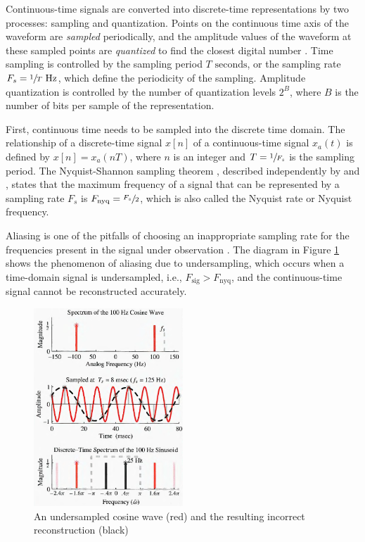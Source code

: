 \documentclass[report.tex]{subfiles}
\begin{document}
Continuous-time signals are converted into discrete-time representations by two processes: sampling and quantization. Points on the continuous time axis of the waveform are \textit{sampled} periodically, and the amplitude values of the waveform at these sampled points are \textit{quantized} to find the closest digital number \parencite{melbook}. Time sampling is controlled by the sampling period $T \text{ seconds}$, or the sampling rate $F_{s} = \sfrac{1}{T} \text{ Hz}$, which define the periodicity of the sampling. Amplitude quantization is controlled by the number of quantization levels $2^{B}$, where $B$ is the number of bits per sample of the representation.

First, continuous time needs to be sampled into the discrete time domain. The relationship of a discrete-time signal $x[n]$ of a continuous-time signal $x_{a}(t)$ is defined by $x[n] = x_{a}(nT)$, where $n$ is an integer and $T = \sfrac{1}{F_{s}}$ is the sampling period. The Nyquist-Shannon sampling theorem \parencite{discretebook}, described independently by \textcite{nyquist1928} and \textcite{shannon1948}, states that the maximum frequency of a signal that can be represented by a sampling rate $F_{s}$ is $F_{\text{nyq}} = \sfrac{F_{s}}{2}$, which is also called the Nyquist rate or Nyquist frequency.

Aliasing is one of the pitfalls of choosing an inappropriate sampling rate for the frequencies present in the signal under observation \parencite{dspfirst}. The diagram in Figure \ref{fig:aliasing} shows the phenomenon of aliasing due to undersampling, which occurs when a time-domain signal is undersampled, i.e., $F_{\text{sig}} > F_{\text{nyq}}$, and the continuous-time signal cannot be reconstructed accurately.

\begin{figure}[ht]
	\centering
	\includegraphics[width=0.5\textwidth]{./images-tftheory/aliasing_undersampling.png}
	\caption{An undersampled cosine wave (red) and the resulting incorrect reconstruction (black) \parencite[82]{dspfirst}}
	\label{fig:aliasing}
\end{figure}
\end{document}
